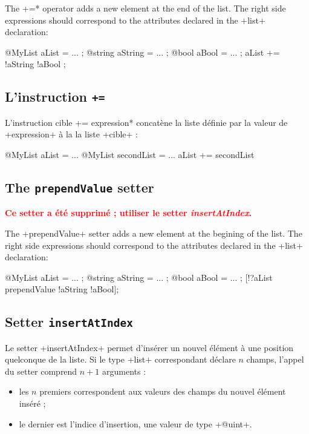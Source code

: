 
The  \ggs*+=* operator adds a new element at the end of the list. The right side expressions should correspond to the attributes declared in the \ggs+list+ declaration:\\

\begin{galgas}
@MyList aList = ... ;
@string aString = ... ;
@bool aBool = ... ;
aList += !aString !aBool ;
\end{galgas}


\subsection{L'instruction \texttt{+=}}

L'instruction \ggs*cible += expression* concatène la liste définie par la valeur de \ggs+expression+ à la la liste \ggs+cible+ :

\begin{galgas}
@MyList aList = ...
@MyList secondList = ...
aList += secondList
\end{galgas}



\subsection{The \texttt{prependValue} setter}

{\bf \textcolor{red}{Ce setter a été supprimé ; utiliser le setter \emph{insertAtIndex}.}}

The \ggs+prependValue+ setter adds a new element at the begining of the list. The right side expressions should correspond to the attributes declared in the  \ggs+list+ declaration:

\begin{galgas}
@MyList aList = ... ;
@string aString = ... ;
@bool aBool = ... ;
[!?aList prependValue !aString !aBool];
\end{galgas}




\subsection{Setter \texttt{insertAtIndex}}

Le setter \ggs+insertAtIndex+ permet d'insérer un nouvel élément à une position quelconque de la liste. Si le type \ggs+list+ correspondant déclare $n$ champs, l'appel du setter comprend $n+1$ arguments :
\begin{itemize}
  \item les $n$ premiers correspondent aux valeurs des champs du nouvel élément inséré ;
  \item le dernier est l'indice d'insertion, une valeur de type \ggs+@uint+.
\end{itemize}

